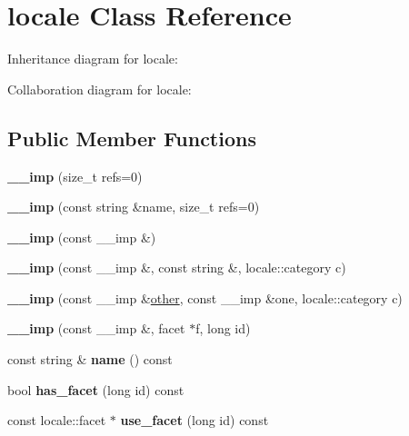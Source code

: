 \hypertarget{classlocale}{}\section{locale Class Reference}
\label{classlocale}


Inheritance diagram for locale\+:


Collaboration diagram for locale\+:
\subsection*{Public Member Functions}
\begin{DoxyCompactItemize}
\item 
\mbox{\label{classlocale_afb1bc13f30f8272fdcba3615918998b2}} 
{\bfseries \+\_\+\+\_\+imp} (size\+\_\+t refs=0)
\item 
\mbox{\label{classlocale_a3d8efea8052a738104ae28802b6953aa}} 
{\bfseries \+\_\+\+\_\+imp} (const string \&name, size\+\_\+t refs=0)
\item 
\mbox{\label{classlocale_a931ce8a5bebfa5137f442a8b9681a36c}} 
{\bfseries \+\_\+\+\_\+imp} (const \+\_\+\+\_\+imp \&)
\item 
\mbox{\label{classlocale_af3a860539600a6bd019a4f3467c980a6}} 
{\bfseries \+\_\+\+\_\+imp} (const \+\_\+\+\_\+imp \&, const string \&, locale\+::category c)
\item 
\mbox{\label{classlocale_aa1b03e63a52f267a6213f8c0a988c730}} 
{\bfseries \+\_\+\+\_\+imp} (const \+\_\+\+\_\+imp \&\mbox{\hyperlink{structother}{other}}, const \+\_\+\+\_\+imp \&one, locale\+::category c)
\item 
\mbox{\label{classlocale_a1aedf62afb6733208563563969317cdf}} 
{\bfseries \+\_\+\+\_\+imp} (const \+\_\+\+\_\+imp \&, facet $\ast$f, long id)
\item 
\mbox{\label{classlocale_ac3f5649de01240c3eff291111fd74d3b}} 
const string \& {\bfseries name} () const
\item 
\mbox{\label{classlocale_ab8d9dd94aadbc4b83ff35192ac1f68ad}} 
bool {\bfseries has\+\_\+facet} (long id) const
\item 
\mbox{\label{classlocale_a065a62ea2286df5332cc83113fb0a734}} 
const locale\+::facet $\ast$ {\bfseries use\+\_\+facet} (long id) const
\end{DoxyCompactItemize}
